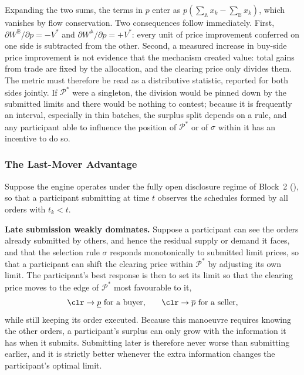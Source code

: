 Expanding the two sums, the terms in $p$ enter as
$p\left(\sum_{\mathbb{A}} x_k - \sum_{\mathbb{B}} x_k\right)$, which
vanishes by flow conservation. Two consequences follow immediately.
First, $\partial W^{\mathbb{B}} / \partial p = -V^{*}$ and
$\partial W^{\mathbb{A}} / \partial p = +V^{*}$: every unit of
price improvement conferred on one side is subtracted from the other.
Second, a measured increase in buy-side price improvement is not evidence
that the mechanism created value: total gains from trade are fixed by the
allocation, and the clearing price only divides them. The metric must
therefore be read as a distributive statistic, reported for both sides
jointly. If $\mathcal{P}^{*}$ were a singleton, the division would be
pinned down by the submitted limits and there would be nothing to
contest; because it is frequently an interval, especially in thin
batches, the surplus split depends on a rule, and any participant able to
influence the position of $\mathcal{P}^{*}$ or of $\sigma$ within it has an
incentive to do so.

\subsubsection{The Last-Mover Advantage}

Suppose the engine operates under the fully open disclosure regime of
Block~2 (), so that a participant submitting at time
$t$ observes the schedules formed by all orders with $t_k < t$.

\textbf{Late submission weakly dominates.} Suppose a participant can see
the orders already submitted by others, and hence the residual supply or
demand it faces, and that the selection rule $\sigma$ responds
monotonically to submitted limit prices, so that a participant can shift
the clearing price within $\mathcal{P}^{*}$ by adjusting its own limit.
The participant's best response is then to set its limit so that the
clearing price moves to the edge of $\mathcal{P}^{*}$ most favourable to it,
\begin{equation}
\label{prop:lastmover}
  \clr \to \underline{p} \text{ for a buyer,} \qquad
  \clr \to \overline{p} \text{ for a seller,}
\end{equation}
while still keeping its order executed. Because this manoeuvre requires
knowing the other orders, a participant's surplus can only grow with the
information it has when it submits. Submitting later is therefore never
worse than submitting earlier, and it is strictly better whenever the
extra information changes the participant's optimal limit.

